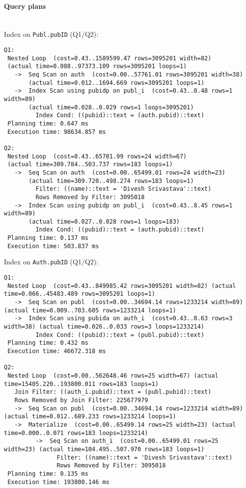 \documentclass[11pt]{scrartcl}
\begin{document}
\paragraph{Query plans}\mbox{}\\ 

\noindent Index on {\tt Publ.pubID} (Q1/Q2):
{\small
\begin{verbatim}
Q1:
 Nested Loop  (cost=0.43..1589599.47 rows=3095201 width=82) 
 (actual time=0.088..97373.109 rows=3095201 loops=1)
   ->  Seq Scan on auth  (cost=0.00..57761.01 rows=3095201 width=38) 
       (actual time=0.012..1694.669 rows=3095201 loops=1)
   ->  Index Scan using pubidp on publ_i  (cost=0.43..0.48 rows=1 width=89) 
       (actual time=0.028..0.029 rows=1 loops=3095201)
         Index Cond: ((pubid)::text = (auth.pubid)::text)
 Planning time: 0.647 ms
 Execution time: 98634.857 ms

Q2:
 Nested Loop  (cost=0.43..65701.99 rows=24 width=67) 
 (actual time=309.784..503.737 rows=183 loops=1)
   ->  Seq Scan on auth  (cost=0.00..65499.01 rows=24 width=23) 
       (actual time=309.720..498.274 rows=183 loops=1)
         Filter: ((name)::text = 'Divesh Srivastava'::text)
         Rows Removed by Filter: 3095018
   ->  Index Scan using pubidp on publ_i  (cost=0.43..8.45 rows=1 width=89) 
       (actual time=0.027..0.028 rows=1 loops=183)
         Index Cond: ((pubid)::text = (auth.pubid)::text)
 Planning time: 0.137 ms
 Execution time: 503.837 ms

\end{verbatim}
}

\noindent Index on {\tt Auth.pubID} (Q1/Q2):
{\small
\begin{verbatim}
Q1:
 Nested Loop  (cost=0.43..849985.42 rows=3095201 width=82) (actual time=0.066..45483.489 rows=3095201 loops=1)
   ->  Seq Scan on publ  (cost=0.00..34694.14 rows=1233214 width=89) (actual time=0.009..703.605 rows=1233214 loops=1)
   ->  Index Scan using pubida on auth_i  (cost=0.43..0.63 rows=3 width=38) (actual time=0.026..0.033 rows=3 loops=1233214)
         Index Cond: ((pubid)::text = (publ.pubid)::text)
 Planning time: 0.432 ms
 Execution time: 46672.318 ms

Q2:
 Nested Loop  (cost=0.00..562648.46 rows=25 width=67) (actual time=15405.220..193800.011 rows=183 loops=1)
   Join Filter: ((auth_i.pubid)::text = (publ.pubid)::text)
   Rows Removed by Join Filter: 225677979
   ->  Seq Scan on publ  (cost=0.00..34694.14 rows=1233214 width=89) (actual time=0.012..689.233 rows=1233214 loops=1)
   ->  Materialize  (cost=0.00..65499.14 rows=25 width=23) (actual time=0.000..0.071 rows=183 loops=1233214)
         ->  Seq Scan on auth_i  (cost=0.00..65499.01 rows=25 width=23) (actual time=104.495..507.970 rows=183 loops=1)
               Filter: ((name)::text = 'Divesh Srivastava'::text)
               Rows Removed by Filter: 3095018
 Planning time: 0.135 ms
 Execution time: 193800.146 ms
\end{verbatim}
}
\end{document}
